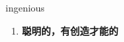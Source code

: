 
\begin{frame}
{\huge ingenious}
\begin{center}
\begin{enumerate}\Large
  \item \textbf{聪明的，有创造才能的}
\end{enumerate}
\end{center}
\end{frame}
